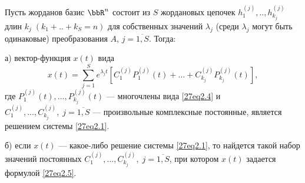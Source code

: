 \begin{thm}\label{27thm2}
Пусть жорданов базис $\bbR^n$ состоит из $S$ жордановых цепочек $h_1^{(j)},..,h_{k_j}^{(j)}$ длин $k_j\; (k_1+..+k_S=n)$ для собственных значений $\lambda_j$ (среди $\lambda_j$ могут быть одинаковые) преобразования $A$, $j=\overline{1,S}$. Тогда:

а) вектор-функция $x(t)$ вида
\begin{equation}\label{27eq2.5}
x(t)=\sum\limits_{j=1}^S e^{\lambda_j t}\left[C_1^{(j)}P_1^{(j)}(t)+...+C_{k_j}^{(j)}P_{k_j}^{(j)}(t)\right],
\end{equation}
где $P_1^{(j)}(t),...,P_{k_j}^{(j)}(t)$ --- многочлены вида \eqref{27eq2.4} и $C_1^{(j)},...,C_{k_j}^{(j)},\; j=\overline{1,S}$ --- произвольные комплексные постоянные, является решением системы \eqref{27eq2.1}.

б) если $x(t)$ --- какое-либо решение системы \eqref{27eq2.1}, то найдется такой набор значений постоянных $C_1^{(j)},...,C_{k_j}^{(j)},\; j=\overline{1,S}$, при котором $x(t)$ задается формулой \eqref{27eq2.5}.
\end{thm}


